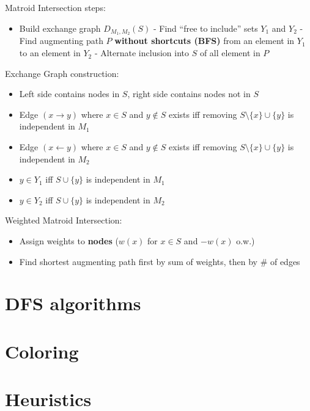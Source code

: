     Matroid Intersection steps:
    \begin{itemize}
     \setlength\itemsep{-1em}
     \item Build exchange graph $D_{M_1, M_2}(S)$
     - Find ``free to include'' sets $Y_1$ and $Y_2$
     - Find augmenting path $P$ \textbf{without shortcuts (BFS)} from an element in $Y_1$ to an element in $Y_2$
     - Alternate inclusion into $S$ of all element in $P$
    \end{itemize}

    Exchange Graph construction:
    \begin{itemize}
     \setlength\itemsep{-1em}
     \item Left side contains nodes in $S$, right side contains nodes not in $S$
     \item Edge $(x \to y)$ where $x \in S$ and $y \notin S$ exists iff removing $S \setminus \{x\} \cup \{y\}$ is independent in $M_1$
     \item Edge $(x \gets y)$ where $x \in S$ and $y \notin S$ exists iff removing $S \setminus \{x\} \cup \{y\}$ is independent in $M_2$
     \item $y \in Y_1$ iff $S \cup \{y\}$ is independent in $M_1$
     \item $y \in Y_2$ iff $S \cup \{y\}$ is independent in $M_2$
    \end{itemize}

     Weighted Matroid Intersection:
    \begin{itemize}
     \setlength\itemsep{-1em}
      \item Assign weights to \textbf{nodes} ($w(x)$ for $x \in S$ and $-w(x)$ o.w.)
      \item Find shortest augmenting path first by sum of weights, then by \# of edges
    \end{itemize}

\section{DFS algorithms}

\section{Coloring}

\section{Heuristics}

